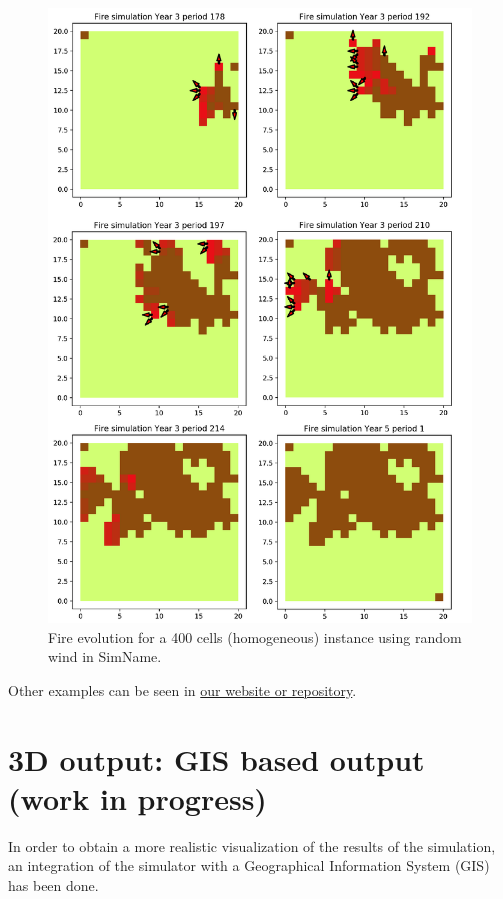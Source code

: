 \documentclass[11pt]{article}
\begin{document}
\begin{enumerate}
\begin{figure}[h!]
\includegraphics[scale=0.5]{400CellsRnd.png}
\centering
\caption{\label{DPE} Fire evolution for a 400 cells (homogeneous) instance using random wind in SimName.}
\end{figure}

Other examples can be seen in \href{http://www.google.com/}{our website or repository}. 

\end{enumerate} 



\newpage



\section{3D output: GIS based output (work in progress)}
In order to obtain a more realistic visualization of the results of the simulation, an integration of the simulator with a Geographical Information System (GIS) has been done. 
\end{document}
